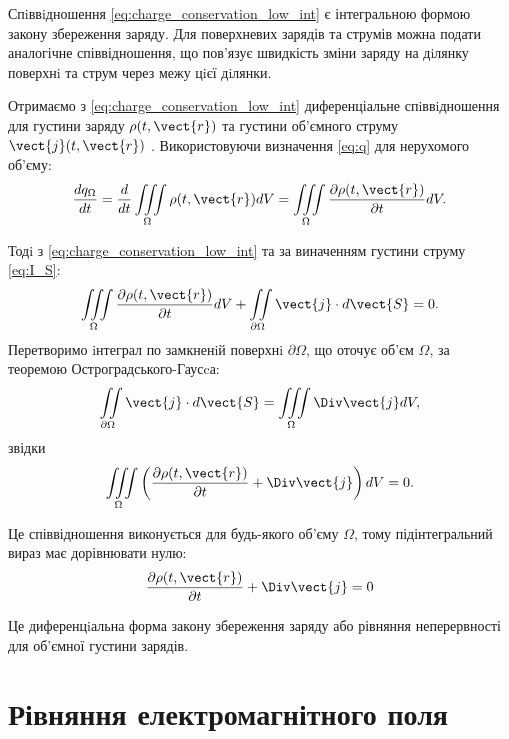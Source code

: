 Спiввiдношення \eqref{eq:charge_conservation_low_int} є інтегральною формою закону збереження
заряду. Для поверхневих зарядів та струмів можна подати аналогічне
співвідношення, що пов’язує швидкість зміни заряду на дiлянку поверхнi та
струм через межу цiєї дiлянки.

Отримаємо з \eqref{eq:charge_conservation_low_int} диференціальне спiввiдношення для густини заряду
$\rho(t, \vect{r})$ та густини об'ємного струму $\vect{j}(t, \vect{r})$ . Використовуючи визначення \eqref{eq:q}
для нерухомого об'єму:
\begin{equation*}
    \frac{dq_{\Omega}}{dt} = \frac{d}{dt} \iiint\limits_{\Omega} \rho(t, \vect{r}) dV = \iiint\limits_{\Omega} \frac{\partial\rho(t, \vect{r})}{\partial
    t} dV.
\end{equation*}

Тодi з \eqref{eq:charge_conservation_low_int}  та за виначенням густини струму \eqref{eq:I_S}:
\begin{equation*}
    \iiint\limits_{\Omega} \frac{\partial\rho(t, \vect{r})}{\partial
    t} dV + \iint\limits_{\partial\Omega} \vect{j}\cdot d\vect{S} = 0.
\end{equation*}
Перетворимо iнтеграл по замкненiй поверхнi $\partial\Omega$, що оточує об'єм $\Omega$, за
теоремою Остроградського-Гаусcа:
\begin{equation*}
    \iint\limits_{\partial\Omega} \vect{j}\cdot d\vect{S} = \iiint\limits_{\Omega}\Div\vect{j} dV,
\end{equation*}
звідки
\begin{equation*}
    \iiint\limits_{\Omega} \left(\frac{\partial\rho(t, \vect{r})}{\partial
    t}  +  \Div\vect{j} \right) dV =0.
\end{equation*}

Це співвідношення виконується для будь-якого об'єму $\Omega$, тому
підінтегральний вираз має дорівнювати нулю:
\begin{equation}\label{eq:charge_conservation_low_diff}
    \frac{\partial\rho(t, \vect{r})}{\partial t}  +  \Div\vect{j}  = 0
\end{equation}

Це диференцiальна форма закону збереження заряду або рівняння неперервності для об’ємної густини зарядів.


\section{Рівняння електромагнітного поля}


